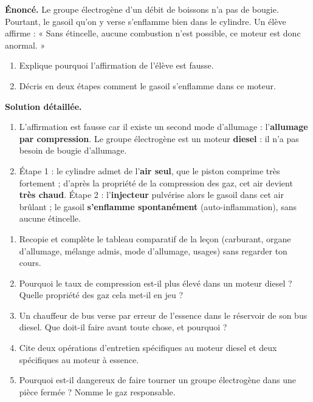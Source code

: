\documentclass[11pt]{article}
\begin{document}
\begin{exoresolu}
\textbf{Énoncé.} Le groupe électrogène d'un débit de boissons n'a pas de bougie. Pourtant, le gasoil qu'on y verse s'enflamme bien dans le cylindre. Un élève affirme : « Sans étincelle, aucune combustion n'est possible, ce moteur est donc anormal. »
\begin{enumerate}
\item Explique pourquoi l'affirmation de l'élève est fausse.
\item Décris en deux étapes comment le gasoil s'enflamme dans ce moteur.
\end{enumerate}
\tcblower
\textbf{Solution détaillée.}
\begin{enumerate}
\item L'affirmation est fausse car il existe un second mode d'allumage : l'\textbf{allumage par compression}. Le groupe électrogène est un moteur \textbf{diesel} : il n'a pas besoin de bougie d'allumage.
\item Étape 1 : le cylindre admet de l'\textbf{air seul}, que le piston comprime très fortement ; d'après la propriété de la compression des gaz, cet air devient \textbf{très chaud}. Étape 2 : l'\textbf{injecteur} pulvérise alors le gasoil dans cet air brûlant ; le gasoil \textbf{s'enflamme spontanément} (auto-inflammation), sans aucune étincelle.
\end{enumerate}
\end{exoresolu}

\begin{exercice}
\begin{enumerate}
\item Recopie et complète le tableau comparatif de la leçon (carburant, organe d'allumage, mélange admis, mode d'allumage, usages) sans regarder ton cours.
\item Pourquoi le taux de compression est-il plus élevé dans un moteur diesel ? Quelle propriété des gaz cela met-il en jeu ?
\item Un chauffeur de bus verse par erreur de l'essence dans le réservoir de son bus diesel. Que doit-il faire avant toute chose, et pourquoi ?
\item Cite deux opérations d'entretien spécifiques au moteur diesel et deux spécifiques au moteur à essence.
\item Pourquoi est-il dangereux de faire tourner un groupe électrogène dans une pièce fermée ? Nomme le gaz responsable.
\end{enumerate}
\end{exercice}
\end{document}
